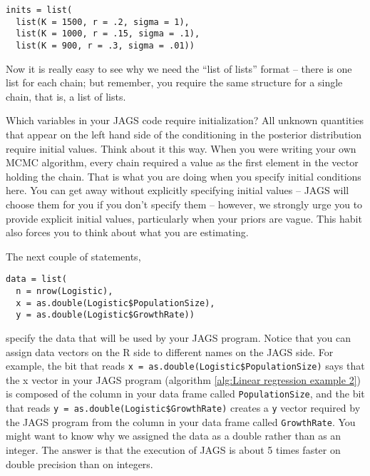 \documentclass[12pt,english]{article}
\begin{document}
\begin{Verbatim}
inits = list(
  list(K = 1500, r = .2, sigma = 1),
  list(K = 1000, r = .15, sigma = .1),
  list(K = 900, r = .3, sigma = .01))
\end{Verbatim}

\noindent Now it is really easy to see why we need the \enquote{list of lists} format -- there is one list for each chain; but remember, you require the same structure for a single chain, that is, a list of lists.

Which variables in your JAGS code require initialization? All unknown quantities that appear on the left hand side of the conditioning in the posterior distribution require initial values. Think about it this way. When you were writing your own MCMC algorithm, every chain required a value as the first element in the vector holding the chain. That is what you are doing when you specify initial conditions here. You can get away without explicitly specifying initial values -- JAGS will choose them for you if you don't specify them -- however, we strongly urge you to provide explicit initial values, particularly when your priors are vague. This habit also forces you to think about what you are estimating.

The next couple of statements, 

\begin{Verbatim}
data = list(
  n = nrow(Logistic),
  x = as.double(Logistic$PopulationSize),
  y = as.double(Logistic$GrowthRate))
\end{Verbatim}

\noindent specify the data that will be used by your JAGS program. Notice that you can assign data vectors on the R side to different names on the JAGS side. For example, the bit that reads \texttt{x = as.double(Logistic\$PopulationSize)} says that the x vector in your JAGS program (algorithm \ref{alg:Linear regression example 2}) is composed of the column in your data frame called \texttt{PopulationSize}, and the bit that reads \texttt{y = as.double(Logistic\$GrowthRate)} creates a \texttt{y} vector required by the JAGS program from the column in your data frame called \texttt{GrowthRate}. You might want to know why we assigned the data as a double rather than as an integer. The answer is that the execution of JAGS is about 5 times faster on double precision than on integers.
\end{document}
